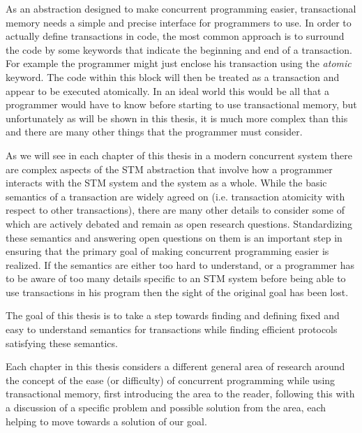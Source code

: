 \documentclass[runningheads,a4paper]{article}
\begin{document}
As an abstraction designed to make concurrent programming easier, transactional memory needs a
simple and precise interface for programmers to use.
In order to actually define transactions in code, the most common
approach is to surround the code by some keywords that indicate the beginning and end of a transaction.
For example the programmer might just enclose his transaction using the \emph{atomic} keyword.
The code within this block will then be treated as a transaction and appear to be executed atomically.
In an ideal world this would be all that a programmer would have to know before starting to use
transactional memory, but unfortunately as will be shown in this thesis, it is much more complex than this
and there are many other things that the programmer must consider.



As we will see in each chapter of this thesis  in a modern concurrent system
there are complex aspects
of the STM abstraction that involve how a programmer interacts with the
STM system and the system as a whole.
While the basic semantics of a transaction are widely agreed on
(i.e. transaction atomicity with respect to other transactions),
there are many other details to consider
some of which are actively debated and remain as open research questions.
Standardizing these semantics and answering open questions on them is an important
step in ensuring that the primary goal of making concurrent programming easier
is realized.
If the semantics are either too hard to understand, or a programmer has to be aware of
too many details specific to an STM system before being able to use transactions in
his program then the sight of the original goal has been lost.


The goal of this thesis is to take a step towards finding and defining fixed and easy to understand semantics
for transactions while finding efficient protocols satisfying these semantics.



Each chapter in this thesis considers a different general area of research around
the concept of the ease (or difficulty) of concurrent programming while using transactional memory, first introducing
the area to the reader, following this with a discussion of a specific problem
and possible solution from the area, each helping to move towards a solution of our goal.
\end{document}
